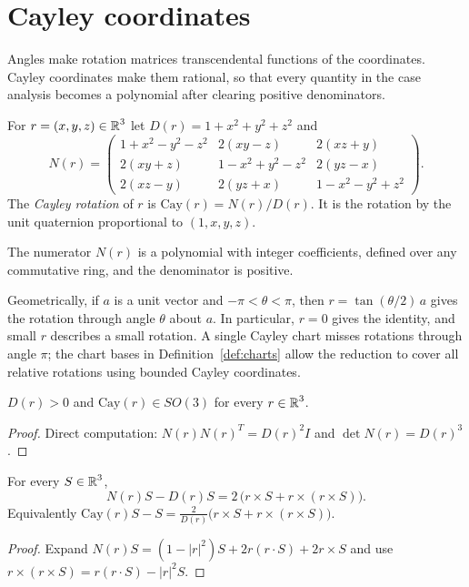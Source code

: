 \chapter{Cayley coordinates}
\label{chap:cayley}

Angles make rotation matrices transcendental functions of the coordinates. Cayley
coordinates make them rational, so that every quantity in the case analysis becomes a
polynomial after clearing positive denominators.

\begin{definition}
\label{def:cayley}
\leanok
For $r = (x, y, z) \in \operatorname{\mathbb{R}}^3$ let $D(r) = 1 + x^2 + y^2 + z^2$ and
\[
  N(r) = \begin{pmatrix}
    1 + x^2 - y^2 - z^2 & 2(xy - z) & 2(xz + y) \\
    2(xy + z) & 1 - x^2 + y^2 - z^2 & 2(yz - x) \\
    2(xz - y) & 2(yz + x) & 1 - x^2 - y^2 + z^2
  \end{pmatrix}.
\]
The \emph{Cayley rotation} of $r$ is $\mathrm{Cay}(r) = N(r) / D(r)$. It is the
rotation by the unit quaternion proportional to $(1, x, y, z)$.
\end{definition}

The numerator $N(r)$ is a polynomial with integer coefficients, defined over any
commutative ring, and the denominator is positive.

Geometrically, if $a$ is a unit vector and $-\pi < \theta < \pi$, then
$r = \tan(\theta/2)\,a$ gives the rotation through angle $\theta$ about $a$.
In particular, $r = 0$ gives the identity, and small $r$ describes a small rotation.
A single Cayley chart misses rotations through angle $\pi$; the chart bases in
Definition~\ref{def:charts} allow the reduction to cover all relative rotations
using bounded Cayley coordinates.

\begin{lemma}
\label{lem:cayley_so3}
\leanok
{}
$D(r) > 0$ and $\mathrm{Cay}(r) \in SO(3)$ for every $r \in \operatorname{\mathbb{R}}^3$.
\end{lemma}
\begin{proof}
\leanok
Direct computation: $N(r) N(r)^T = D(r)^2 I$ and $\det N(r) = D(r)^3$.
\end{proof}

\begin{lemma}
\label{lem:cayley_rodrigues}
\leanok
{}
For every $S \in \operatorname{\mathbb{R}}^3$,
\[
  N(r) S - D(r) S = 2\,\bigl(r \times S + r \times (r \times S)\bigr).
\]
Equivalently $\mathrm{Cay}(r) S - S = \frac{2}{D(r)} \bigl(r \times S + r \times (r \times S)\bigr)$.
\end{lemma}
\begin{proof}
\leanok
Expand $N(r) S = (1 - |r|^2) S + 2 r (r \cdot S) + 2 r \times S$ and use
$r \times (r \times S) = r (r \cdot S) - |r|^2 S$.
\end{proof}


